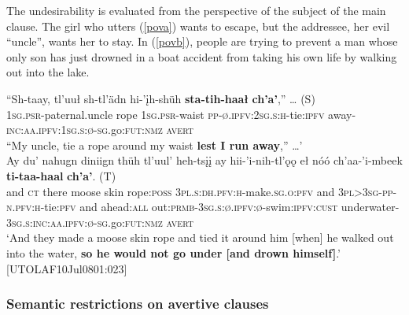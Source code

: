 \documentclass[output=paper,colorlinks,citecolor=brown
]{langscibook}
\begin{document}
The undesirability is evaluated from the perspective of the subject of the main clause. The girl who utters (\ref{pova}) wants to escape, but the addressee, her evil ``uncle'', wants her to stay. In (\ref{povb}), people are trying to prevent a man whose only son has just drowned in a boat accident from taking his own life by walking out into the lake.

\begin{exe}
\ex \label{pov}
\begin{xlista}
\ex \label{pova}
\gll ``Sh-taay, tl'uuł  sh-tl'ädn hi-'įh-shüh \textbf{sta-tih-haał} \textbf{ch'a'},'' {\ldots} \textnormal{(S})\\
\textsc{1sg.psr}-paternal.uncle rope \textsc{1sg.psr}-waist \textsc{pp-ø.ipfv:2sg.s:h}-tie:\textsc{ipfv} away-\textsc{inc:aa.ipfv:1sg.s:ø-sg}.go:\textsc{fut:nmz} \textsc{avert} \\
``My uncle, tie a rope around my waist \textbf{lest I run away},'' \ldots'  \\ \hfill \citep[26]{TyoneM1996}
\ex\label{povb}
\gll Ay du' nahugn diniign thüh tl'uul' heh-tsįį ay hii-'i-nih-tl'ǫǫ eł nóó ch'aa-'i-mbeek \textbf{ti-taa-haal} \textbf{ch'a'}. \textnormal{(T)} \\
and \textsc{ct} there moose skin rope:\textsc{poss} \textsc{3pl.s:dh.pfv:h}-make.\textsc{sg.o:pfv} and \textsc{3pl>3sg-pp-n.pfv:h}-tie:\textsc{pfv} and ahead:\textsc{all}  out:\textsc{prmb-3sg.s:ø.ipfv:ø}-swim:\textsc{ipfv:cust} underwater-\textsc{3sg.s:inc:aa.ipfv:ø-sg}.go:\textsc{fut:nmz} \textsc{avert} \\
\glt `And they made a moose skin rope and tied it around him [when] he walked out into the water, \textbf{so he would not go under [and drown himself]}.' \\ \hfill [UTOLAF10Jul0801:023]
\end{xlista}
\end{exe}


\subsubsection{Semantic restrictions on avertive clauses}
\label{subsubsection:avertive-restrictions}
\end{document}
